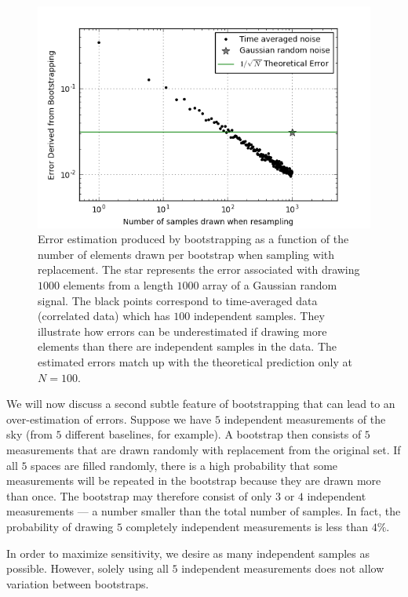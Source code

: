 \documentclass[preprint2,numberedappendix,tighten]{aastex6}  %
\begin{document}
\begin{figure}
	\centering
	\includegraphics[trim={0.3cm 0.3cm 0.3cm 0.3cm},width=\columnwidth]{plots/toy_error1.png}
	\caption{Error estimation produced by bootstrapping as a function of the number of elements drawn per bootstrap when sampling with replacement. The star represents the error associated with drawing $1000$ elements from a length $1000$ array of a Gaussian random signal. The black points correspond to time-averaged data (correlated data) which has $100$ independent samples. They illustrate how errors can be underestimated if drawing more elements than there are independent samples in the data. The estimated errors match up with the theoretical prediction only at $N=100$.}
	\label{fig:toy_error1}
\end{figure}

We will now discuss a second subtle feature of bootstrapping that can lead to an over-estimation of errors. Suppose we have $5$ independent measurements of the sky (from $5$ different baselines, for example). A bootstrap then consists of $5$ measurements that are drawn randomly with replacement from the original set. If all $5$ spaces are filled randomly, there is a high probability that some measurements will be repeated in the bootstrap because they are drawn more than once. The bootstrap may therefore consist of only $3$ or $4$ independent measurements --- a number smaller than the total number of samples.  In fact, the probability of drawing $5$ completely independent measurements is less than $4\%$.

In order to maximize sensitivity, we desire as many independent samples as possible. However, solely using all $5$ independent measurements does not allow variation between bootstraps. 
\end{document}
